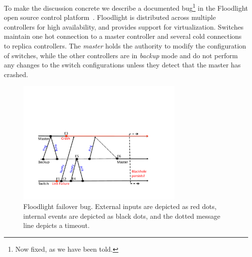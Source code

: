 %
%

To make the discussion concrete we describe a
documented bug\footnote{Now fixed, as we have been told.} in the Floodlight
open source control platform~\cite{floodlight_bug}. Floodlight is distributed across
multiple controllers for high availability, and provides support for
virtualization. Switches maintain one hot connection to a master controller and
several cold connections to replica controllers. The \emph{master} holds the
authority to modify the configuration of switches, while the other
controllers are in \emph{backup} mode and do not perform any changes to the
switch configurations unless they detect that the master has crashed.

\begin{figure}[t]
  \includegraphics[width=3.25in]{../diagrams/case_study/example_bug.pdf}
  \caption[]{\label{fig:example} Floodlight failover bug. External inputs
             are depicted as red dots, internal events are depicted as black
             dots, and the dotted message line depicts a timeout.}
\end{figure}

